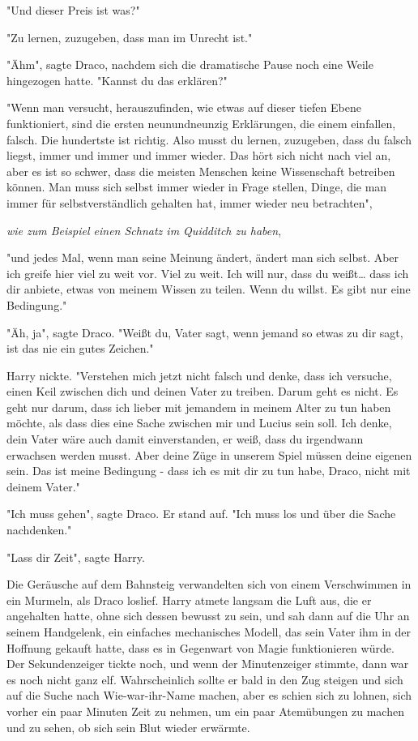 {"Und dieser Preis ist was?"

"Zu lernen, zuzugeben, dass man im Unrecht ist."

"Ähm", sagte Draco, nachdem sich die dramatische Pause noch eine Weile hingezogen hatte. "Kannst du das erklären?"

"Wenn man versucht, herauszufinden, wie etwas auf dieser tiefen Ebene funktioniert, sind die ersten neunundneunzig Erklärungen, die einem einfallen, falsch. Die hundertste ist richtig. Also musst du lernen, zuzugeben, dass du falsch liegst, immer und immer und immer wieder. Das hört sich nicht nach viel an, aber es ist so schwer, dass die meisten Menschen keine Wissenschaft betreiben können. Man muss sich selbst immer wieder in Frage stellen, Dinge, die man immer für selbstverständlich gehalten hat, immer wieder neu betrachten",

\emph{wie zum Beispiel einen Schnatz im Quidditch zu haben},

"und jedes Mal, wenn man seine Meinung ändert, ändert man sich selbst. Aber ich greife hier viel zu weit vor. Viel zu weit. Ich will nur, dass du weißt… dass ich dir anbiete, etwas von meinem Wissen zu teilen. Wenn du willst. Es gibt nur eine Bedingung."

"Äh, ja", sagte Draco. "Weißt du, Vater sagt, wenn jemand so etwas zu dir sagt, ist das nie ein gutes Zeichen."

Harry nickte. "Verstehen mich jetzt nicht falsch und denke, dass ich versuche, einen Keil zwischen dich und deinen Vater zu treiben. Darum geht es nicht. Es geht nur darum, dass ich lieber mit jemandem in meinem Alter zu tun haben möchte, als dass dies eine Sache zwischen mir und Lucius sein soll. Ich denke, dein Vater wäre auch damit einverstanden, er weiß, dass du irgendwann erwachsen werden musst. Aber deine Züge in unserem Spiel müssen deine eigenen sein. Das ist meine Bedingung - dass ich es mit dir zu tun habe, Draco, nicht mit deinem Vater."

"Ich muss gehen", sagte Draco. Er stand auf. "Ich muss los und über die Sache nachdenken."

"Lass dir Zeit", sagte Harry.

Die Geräusche auf dem Bahnsteig verwandelten sich von einem Verschwimmen in ein Murmeln, als Draco loslief. Harry atmete langsam die Luft aus, die er angehalten hatte, ohne sich dessen bewusst zu sein, und sah dann auf die Uhr an seinem Handgelenk, ein einfaches mechanisches Modell, das sein Vater ihm in der Hoffnung gekauft hatte, dass es in Gegenwart von Magie funktionieren würde. Der Sekundenzeiger tickte noch, und wenn der Minutenzeiger stimmte, dann war es noch nicht ganz elf. Wahrscheinlich sollte er bald in den Zug steigen und sich auf die Suche nach Wie-war-ihr-Name machen, aber es schien sich zu lohnen, sich vorher ein paar Minuten Zeit zu nehmen, um ein paar Atemübungen zu machen und zu sehen, ob sich sein Blut wieder erwärmte.

}
